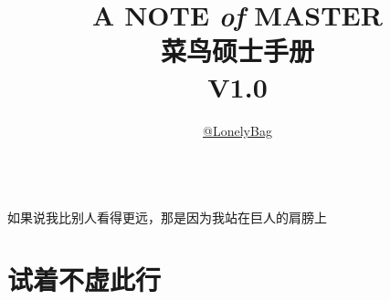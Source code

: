 \documentclass[UTF8]{ctexbook}
\title{\Huge{A NOTE {\itshape of} MASTER}\\
\Huge{菜鸟硕士手册}\\
\large{V1.0}}
\author{\href{https://github.com/lonelybag/Latex_lonelybag}{\Large{@LonelyBag}}}
\begin{document}
\frontmatter
\maketitle


\begin{center}  %
	\quad \\
	\vspace{5cm}
	\LARGE{如果说我比别人看得更远，那是因为我站在巨人的肩膀上}\\
\end{center}
\thispagestyle{empty}
\tableofcontents

\mainmatter
\chapter{试着不虚此行}
\end{document}
